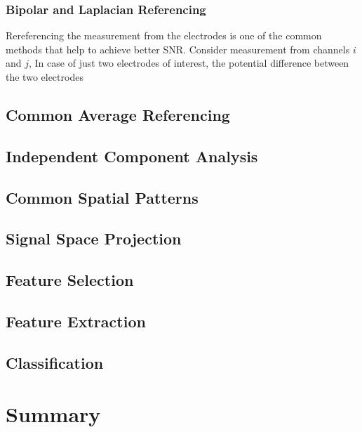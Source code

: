 \subsubsection{Bipolar and Laplacian Referencing}
Rereferencing the measurement from the electrodes is one of the common methods that help to achieve better SNR.
Consider measurement from channels $i$ and $j$, 
In case of just two electrodes of interest, the potential difference between the two electrodes 

\subsection{Common Average Referencing}

\subsection{Independent Component Analysis}

\subsection{Common Spatial Patterns}

\subsection{Signal Space Projection}

\subsection{Feature Selection}

\subsection{Feature Extraction}

\subsection{Classification}

\section*{Summary}

